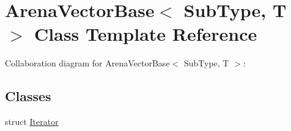 \hypertarget{class_arena_vector_base}{}\section{Arena\+Vector\+Base$<$ Sub\+Type, T $>$ Class Template Reference}
\label{class_arena_vector_base}


Collaboration diagram for Arena\+Vector\+Base$<$ Sub\+Type, T $>$\+:
\subsection*{Classes}
\begin{DoxyCompactItemize}
\item 
struct \mbox{\hyperlink{struct_arena_vector_base_1_1_iterator}{Iterator}}
\end{DoxyCompactItemize}
